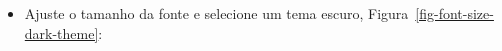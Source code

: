\documentclass[
  letterpaper,
]{book}
\providecommand{\tightlist}{%
  \setlength{\itemsep}{0pt}\setlength{\parskip}{0pt}}\usepackage{longtable,booktabs,array}
\theoremstyle{plain}
\theoremstyle{definition}
\theoremstyle{remark}
\begin{document}
\begin{figure}


\caption{\label{fig-native-pipe-operator}}

\end{figure}%

\begin{itemize}
\tightlist
\item
  Ajuste o tamanho da fonte e selecione um tema escuro,
  Figura~\ref{fig-font-size-dark-theme}:
\end{itemize}
\end{document}

